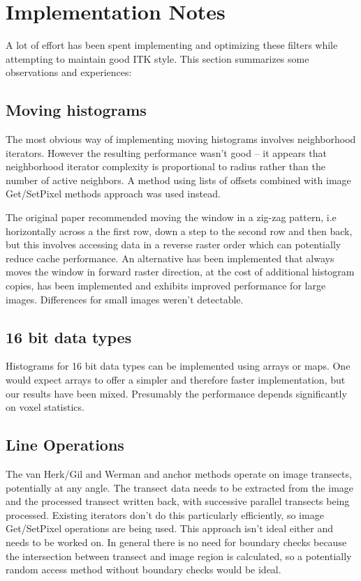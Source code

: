 \documentclass{InsightArticle}
\begin{document}
\section{Implementation Notes}
A lot of effort has been spent implementing and optimizing these filters 
while attempting to maintain good ITK style. This section summarizes some observations
and experiences:
\subsection{Moving histograms}
The most obvious way of implementing moving histograms involves
neighborhood iterators.  However the resulting performance wasn't good
-- it appears that neighborhood iterator complexity is proportional to
radius rather than the number of active neighbors. A method using
lists of offsets combined with image Get/SetPixel methods approach was
used instead.

The original paper recommended moving the window in a zig-zag pattern, i.e horizontally 
across a the first row, down a step to the second row and then back, but this involves
accessing data in a reverse raster order which can potentially reduce cache performance.
An alternative has been implemented that always moves the window in forward raster direction,
at the cost of additional histogram copies, has been implemented and exhibits improved
performance for large images. Differences for small images weren't detectable.

\subsection{16 bit data types}
Histograms for 16 bit data types can be implemented using arrays or maps. One would
expect arrays to offer a simpler and therefore faster implementation, but our results
have been mixed. Presumably the performance depends significantly on voxel statistics.

\subsection{Line Operations}
The van Herk/Gil and Werman and anchor methods operate on image transects, potentially
at any angle. The transect data needs to be extracted from the image and the processed
transect written back, with successive parallel transects being processed. 
Existing iterators don't do this particularly efficiently, so image Get/SetPixel operations 
are being used. This approach isn't ideal either and needs to be worked on. In general
there is no need for boundary checks because the intersection between transect and image region
is calculated, so a potentially random access method without boundary checks would be ideal.
\end{document}
